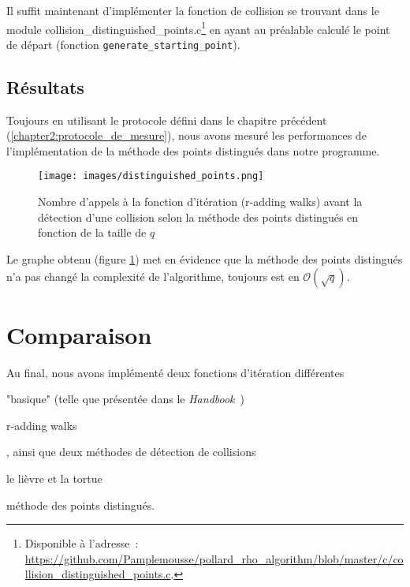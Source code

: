       Il suffit maintenant d'implémenter la fonction de collision se trouvant dans le module collision\_distinguished\_points.c\footnote{Disponible à l'adresse~: \url{https://github.com/Pamplemousse/pollard_rho_algorithm/blob/master/c/collision_distinguished_points.c}.} en ayant au préalable calculé le point de départ (fonction \lstinline{generate_starting_point}).

      \subsection{Résultats}
      Toujours en utilisant le protocole défini dans le chapitre précédent (\ref{chapter2:protocole_de_mesure}), nous avons mesuré les performances de l'implémentation de la méthode des points distingués dans notre programme.

      \begin{figure}
        \center{}
        \texttt{[image: images/distinguished\_points.png]}
        \caption{Nombre d'appels à la fonction d'itération (r-adding walks) avant la détection d'une collision selon la méthode des points distingués en fonction de la taille de $q$}
        \label{fig:r_adding_walks_and_distinguished_points_results}
      \end{figure}

      Le graphe obtenu (figure \ref{fig:r_adding_walks_and_distinguished_points_results}) met en évidence que la méthode des points distingués n'a pas changé la complexité de l'algorithme, toujours est en $\mathcal{O}(\sqrt{q})$.


    \section{Comparaison}
    Au final, nous avons implémenté deux fonctions d'itération différentes
    \begin{enumerate*}
      \item "basique" (telle que présentée dans le \textit{Handbook}~\autocite[107]{handbook})
      \item r-adding walks
    \end{enumerate*}
    , ainsi que deux méthodes de détection de collisions
    \begin{enumerate*}
      \item le lièvre et la tortue
      \item méthode des points distingués.
    \end{enumerate*}

